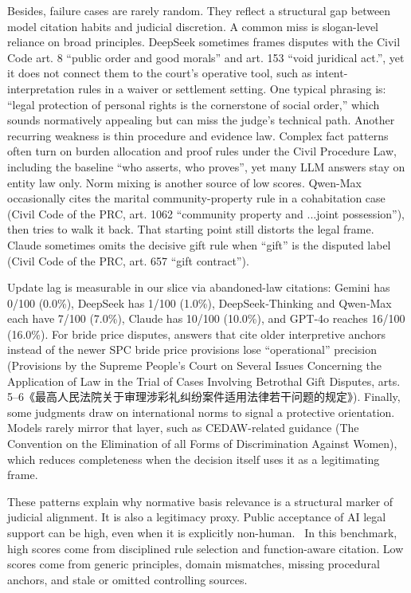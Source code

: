 {{{{{{{{{{{{{Besides, failure cases are rarely random. They reflect a structural gap between model citation habits and judicial discretion. A common miss is slogan-level reliance on broad principles. DeepSeek sometimes frames disputes with the Civil Code art. 8 ``public order and good morals'' and art. 153 ``void juridical act.'', yet it does not connect them to the court's operative tool, such as intent-interpretation rules in a waiver or settlement setting. One typical phrasing is: ``legal protection of personal rights is the cornerstone of social order,'' which sounds normatively appealing but can miss the judge's technical path. Another recurring weakness is thin procedure and evidence law. Complex fact patterns often turn on burden allocation and proof rules under the Civil Procedure Law, including the baseline ``who asserts, who proves'', yet many LLM answers stay on entity law only. Norm mixing is another source of low scores. Qwen-Max occasionally cites the marital community-property rule in a cohabitation case (Civil Code of the PRC, art. 1062 ``community property and ...joint possession''), then tries to walk it back. That starting point still distorts the legal frame. Claude sometimes omits the decisive gift rule when ``gift'' is the disputed label (Civil Code of the PRC, art. 657 ``gift contract'').

Update lag is measurable in our slice via abandoned-law citations: Gemini has 0/100 (0.0\%), DeepSeek has 1/100 (1.0\%), DeepSeek‑Thinking and Qwen‑Max each have 7/100 (7.0\%), Claude has 10/100 (10.0\%), and GPT‑4o reaches 16/100 (16.0\%). For bride price disputes, answers that cite older interpretive anchors instead of the newer SPC bride price provisions lose ``operational'' precision (Provisions by the Supreme People's Court on Several Issues Concerning the Application of Law in the Trial of Cases Involving Betrothal Gift Disputes, arts. 5--6《最高人民法院关于审理涉彩礼纠纷案件适用法律若干问题的规定》). Finally, some judgments draw on international norms to signal a protective orientation. Models rarely mirror that layer, such as CEDAW-related guidance (The Convention on the Elimination of all Forms of Discrimination Against Women), which reduces completeness when the decision itself uses it as a legitimating frame.

These patterns explain why normative basis relevance is a structural marker of judicial alignment. It is also a legitimacy proxy. Public acceptance of AI legal support can be high, even when it is explicitly non-human.~\cite{ref96} In this benchmark, high scores come from disciplined rule selection and function-aware citation. Low scores come from generic principles, domain mismatches, missing procedural anchors, and stale or omitted controlling sources.

}}}}}}}}}}}}}
